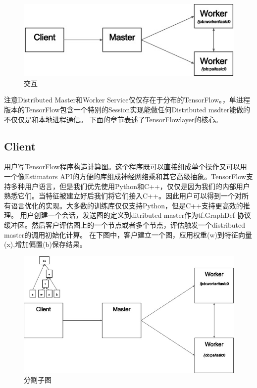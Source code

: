 \documentclass{book}
\begin{document}
\begin{figure}[H]
	\centering
	\includegraphics[scale=0.5]{diag1.jpg}
	\caption{交互}
	\label{fig:tf_ext2}
\end{figure}
注意Distributed Master和Worker Service仅仅存在于分布的TensorFlow。，单进程版本的TensorFlow包含一个特别的Session实现能做任何Distributed msdter能做的不仅仅是和本地进程通信。
下面的章节表述了TensorFlowlayer的核心。
\subsection{Client}
用户写TensorFlow程序构造计算图。这个程序既可以直接组成单个操作又可以用一个像Estimators API的方便的库组成神经网络乘和其它高级抽象。TensorFlow支持多种用户语言，但是我们优先使用Python和C++，仅仅是因为我们的内部用户熟悉它们。当特征被建立好后我们将它们接入C++。因此用户可以得到一个对所有语言优化的实现。大多数的训练库仅仅支持Python，但是C++支持更高效的推理。
用户创建一个会话，发送图的定义到ditributed master作为tf.GraphDef 协议缓冲区。然后客户评估图上的一个节点或者多个节点，评估触发一个distributed master的调用初始化计算。
在下图中，客户建立一个图，应用权重(w)到特征向量(x),增加偏置(b)保存结果。
\begin{figure}[H]
\centering
\includegraphics[scale=0.5]{graph_client.jpg}
	\caption{分割子图}
	\label{fig:tf_ext3}
\end{figure}
\end{document}
